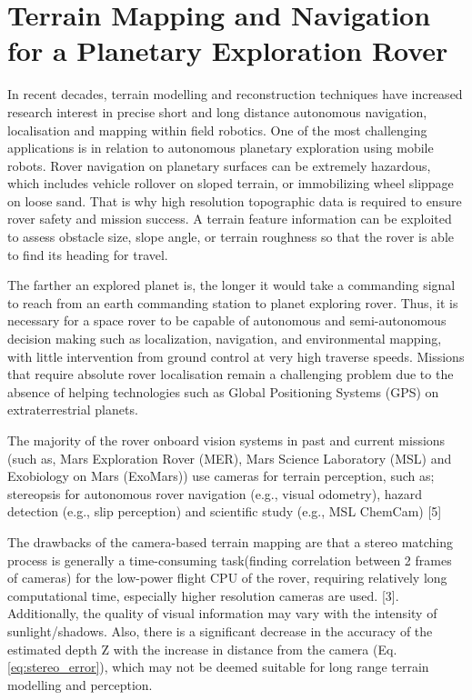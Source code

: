 \section{Terrain Mapping and Navigation for a Planetary Exploration Rover
}

In recent decades, terrain modelling and reconstruction techniques have increased research
interest in precise short and long distance autonomous navigation, localisation and mapping within field robotics. One of the most challenging applications is in relation to autonomous planetary exploration using mobile robots.
Rover navigation on planetary surfaces can be extremely hazardous, which includes vehicle rollover on sloped terrain, or immobilizing wheel slippage on loose sand. That is why high
resolution topographic data is required to ensure rover safety and mission success. 
A terrain feature information can be exploited to assess
obstacle size, slope angle, or terrain roughness so that
the rover is able to find its heading for travel.

The farther an explored planet is, the longer it would take a commanding signal to reach from an earth commanding station to planet exploring rover.
Thus, it is necessary for a space rover to be capable of autonomous and semi-autonomous decision making such as localization, navigation, and environmental mapping, with little intervention from ground control at very high traverse speeds. Missions that require absolute rover localisation remain a challenging problem due to the absence of helping technologies such as Global Positioning Systems (GPS) on extraterrestrial planets.

The majority of the rover onboard vision systems in past and current missions (such as, Mars
Exploration Rover (MER), Mars Science Laboratory (MSL) and Exobiology on Mars (ExoMars)) use
cameras for terrain perception, such as; stereopsis for autonomous rover navigation (e.g., visual odometry), hazard detection (e.g., slip perception) and scientific study (e.g., MSL ChemCam) [5] %

The drawbacks of the camera-based terrain mapping are that
a stereo matching process is generally a time-consuming task(finding correlation between 2 frames of cameras) for the low-power flight CPU of the rover, requiring relatively long computational time, especially higher resolution cameras are used. [3]. Additionally, the
quality of visual information may vary with the intensity of sunlight/shadows. %
Also, there is a significant decrease in the accuracy of the estimated depth Z with the increase in distance from the camera (Eq. \ref{eq:stereo_error}), which may not be deemed suitable for long range terrain modelling and perception. 



